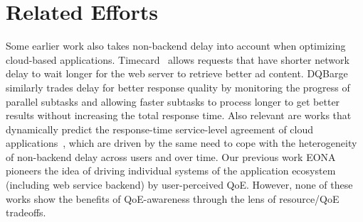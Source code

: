 \section{Related Efforts}
Some earlier work also takes non-backend delay into account when optimizing cloud-based applications. 
Timecard~\cite{timecard} allows requests that have shorter network delay to wait longer for the web server to retrieve better ad content. 
DQBarge~\cite{dqbarge} similarly trades delay for better response quality by monitoring the progress of parallel subtasks and allowing faster subtasks to process longer to get better results without increasing the total response time.
Also relevant are works that dynamically predict the response-time service-level agreement of cloud applications~\cite{Rich Wolski}, which are driven by the same need to cope with the heterogeneity of non-backend delay across users and over time.
Our previous work EONA~\cite{eona} pioneers the idea of driving individual systems of the application ecosystem (including web service backend) by user-perceived QoE.
However, none of these works show the benefits of QoE-awareness through the lens of resource/QoE tradeoffs. 



